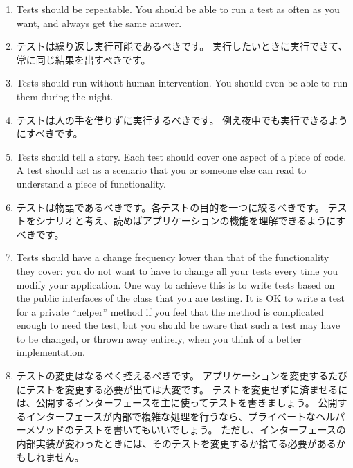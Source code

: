 \documentclass[a4paper,10pt,twoside]{book}
\begin{document}
\begin{enumerate}
\item Tests should be repeatable.  You should be able to run a test
  as often as you want, and always get the same answer.
\fi

\item テストは繰り返し実行可能であるべきです。
  実行したいときに実行できて、常に同じ結果を出すべきです。

\item Tests should run without human intervention.  You should even be
  able to run them during the night.
\fi

\item テストは人の手を借りずに実行するべきです。
  例え夜中でも実行できるようにすべきです。

\item Tests should tell a story.  Each test should cover one aspect of a 
  piece of code.  A test should act as a scenario that you or someone else can
  read to understand a piece of functionality. \label{prop:oneAspect}
\fi

\item テストは物語であるべきです。各テストの目的を一つに絞るべきです。
  テストをシナリオと考え、読めばアプリケーションの機能を理解できるようにすべきです。 \label{prop:oneAspect}

\item Tests should have a change frequency lower than that of the
  functionality they cover:  you do not want to have to change all your
  tests every time you modify your application.  One way to achieve
  this is to write tests based on the public interfaces of the
  class that you are testing.  
  It is OK to write a test for a private ``helper'' method if you feel that the method
  is complicated enough to need the test, but you should be aware that such a test 
  may have to be changed, or thrown away entirely, when you think of a better
  implementation.
\fi

\item テストの変更はなるべく控えるべきです。
  アプリケーションを変更するたびにテストを変更する必要が出ては大変です。
  テストを変更せずに済ませるには、公開するインターフェースを主に使ってテストを書きましょう。
  公開するインターフェースが内部で複雑な処理を行うなら、プライベートなヘルパーメソッドのテストを書いてもいいでしょう。
  ただし、インターフェースの内部実装が変わったときには、そのテストを変更するか捨てる必要があるかもしれません。

\end{enumerate}
\end{document}
